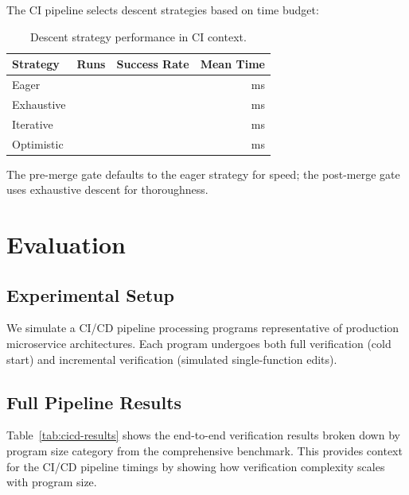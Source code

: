 \documentclass[11pt]{article}
\begin{document}
The CI pipeline selects descent strategies based on time budget:

\begin{table}[t]
\centering
\caption{Descent strategy performance in CI context.}
\label{tab:descent-ci}
\begin{tabular}{lrrr}
\toprule
\textbf{Strategy} & \textbf{Runs} & \textbf{Success Rate} & \textbf{Mean Time} \\
\midrule
Eager       & \compDescentEagerRuns{} & \compDescentEagerRate{} &
  \compDescentEagerMeanMs{}\,ms \\
Exhaustive  & \compDescentExhaustiveRuns{} & \compDescentExhaustiveRate{} &
  \compDescentExhaustiveMeanMs{}\,ms \\
Iterative   & \compDescentIterativeRuns{} & \compDescentIterativeRate{} &
  \compDescentIterativeMeanMs{}\,ms \\
Optimistic  & \compDescentOptimisticRuns{} & \compDescentOptimisticRate{} &
  \compDescentOptimisticMeanMs{}\,ms \\
\bottomrule
\end{tabular}
\end{table}

The pre-merge gate defaults to the eager strategy for speed; the post-merge
gate uses exhaustive descent for thoroughness.

\section{Evaluation}\label{sec:evaluation}

\subsection{Experimental Setup}

We simulate a CI/CD pipeline processing \ppLXVprogramCount{} programs
representative of production microservice architectures. Each program
undergoes both full verification (cold start) and incremental verification
(simulated single-function edits).

\subsection{Full Pipeline Results}

Table~\ref{tab:cicd-results} shows the end-to-end verification results
broken down by program size category from the comprehensive benchmark.
This provides context for the CI/CD pipeline timings by showing how
verification complexity scales with program size.
\end{document}
